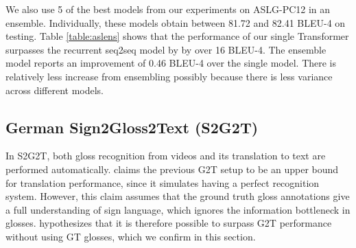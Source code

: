 \documentclass[11pt]{article}
\begin{document}
\begin{center}
\label{table:aslens}
\end{center}

We also use 5 of the best models from our experiments on ASLG-PC12 in an ensemble. Individually, these models obtain between 81.72 and 82.41 BLEU-4 on testing. Table \ref{table:aslens} shows that the performance of our single Transformer surpasses the recurrent seq2seq model by  by over 16 BLEU-4. The ensemble model reports an improvement of 0.46 BLEU-4 over the single model. There is relatively less increase from ensembling possibly because there is less variance across different models.

\subsection{German Sign2Gloss2Text (S2G2T)}
In S2G2T, both gloss recognition from videos and its translation to text are performed automatically.  claims the previous G2T setup to be an upper bound for translation performance, since it simulates having a perfect recognition system. However, this claim assumes that the ground truth gloss annotations give a full understanding of sign language, which ignores the information bottleneck in glosses.  hypothesizes that it is therefore possible to surpass G2T performance without using GT glosses, which we confirm in this section. 
\end{document}
